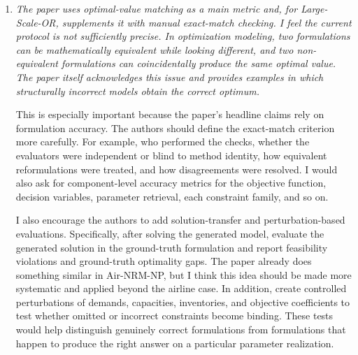 \documentclass[11pt]{article}
\newcommand{\edit}[1]{{\color{hopkins-blue}\itshape #1}}
\begin{document}
\begin{enumerate}[label=(R1.Major.\arabic*),leftmargin=*]
\vspace{2mm}
\noindent\textbf{4. Scope of the Air-NRM Case Study}


[Response to be added.]





\item \edit{The paper uses optimal-value matching as a main metric and, for Large-Scale-OR, supplements it with manual exact-match checking. I feel the current protocol is not sufficiently precise. In optimization modeling, two formulations can be mathematically equivalent while looking different, and two non-equivalent formulations can coincidentally produce the same optimal value. The paper itself acknowledges this issue and provides examples in which structurally incorrect models obtain the correct optimum.

This is especially important because the paper's headline claims rely on formulation accuracy. The authors should define the exact-match criterion more carefully. For example, who performed the checks, whether the evaluators were independent or blind to method identity, how equivalent reformulations were treated, and how disagreements were resolved. I would also ask for component-level accuracy metrics for the objective function, decision variables, parameter retrieval, each constraint family, and so on.

I also encourage the authors to add solution-transfer and perturbation-based evaluations. Specifically, after solving the generated model, evaluate the generated solution in the ground-truth formulation and report feasibility violations and ground-truth optimality gaps. The paper already does something similar in Air-NRM-NP, but I think this idea should be made more systematic and applied beyond the airline case. In addition, create controlled perturbations of demands, capacities, inventories, and objective coefficients to test whether omitted or incorrect constraints become binding. These tests would help distinguish genuinely correct formulations from formulations that happen to produce the right answer on a particular parameter realization.}\label{R1-major-2}


\end{enumerate}
\end{document}
